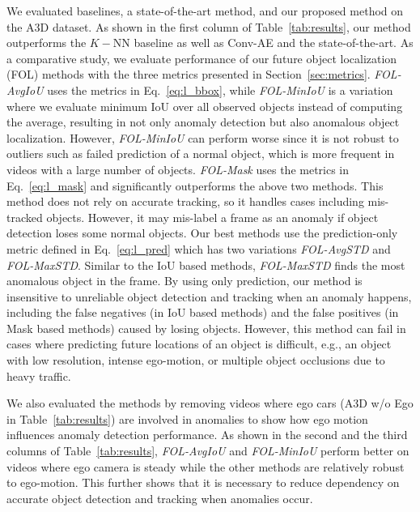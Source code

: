\documentclass[letterpaper, 10 pt, conference]{ieeeconf}
\theoremstyle{definition}
\theoremstyle{remark}
\begin{document}
\vspace{-5pt}
We evaluated baselines, a
state-of-the-art method, and our proposed method on the A3D dataset.
As shown in the first column of Table~\ref{tab:results}, our
method outperforms the $K-$NN baseline as well as Conv-AE and the state-of-the-art. As a comparative study, we evaluate
performance of our future object localization (FOL) methods with the three metrics presented in
Section~\ref{sec:metrics}. \textit{FOL-AvgIoU} uses the metrics in
Eq.~\eqref{eq:l_bbox}, while \textit{FOL-MinIoU} is a variation where we
evaluate minimum IoU over all observed objects instead of computing
the average, resulting in not only anomaly detection but also
anomalous object localization. However, \textit{FOL-MinIoU} can
perform worse since it is not robust to outliers such as failed
prediction of a normal object, which is more frequent in videos with a
large number of objects. \textit{FOL-Mask} uses the metrics in
Eq.~\eqref{eq:l_mask} and significantly outperforms the above two methods. This
method does not rely on accurate tracking, so it handles cases
including mis-tracked objects. However, it may mis-label a frame as an
anomaly if object detection loses some normal objects. Our best
methods use the prediction-only metric defined in
Eq.~\eqref{eq:l_pred} which has two variations \textit{FOL-AvgSTD}
and \textit{FOL-MaxSTD}. Similar to the IoU based methods, 
\textit{FOL-MaxSTD} finds the most anomalous object in the frame.
By using only prediction, our method is insensitive to
unreliable object detection and tracking when an anomaly happens,
including the false negatives (in IoU based methods) and the false
positives (in Mask based methods) caused by losing 
objects. However, this method can fail in cases where predicting future locations
of an object is difficult, e.g., an object with low resolution,
intense ego-motion, or multiple object occlusions due to heavy
traffic.

We also evaluated the methods by removing videos where ego cars 
(A3D w/o Ego in Table~\ref{tab:results})
are involved in anomalies to show how ego motion influences
anomaly detection performance. As shown in the second and the third
columns of Table~\ref{tab:results}, \textit{FOL-AvgIoU} and
\textit{FOL-MinIoU} perform better on videos where ego camera is steady
while the
other methods are relatively robust to ego-motion. This further
shows that it is necessary to reduce dependency on accurate object
detection and tracking when anomalies occur.
\end{document}
